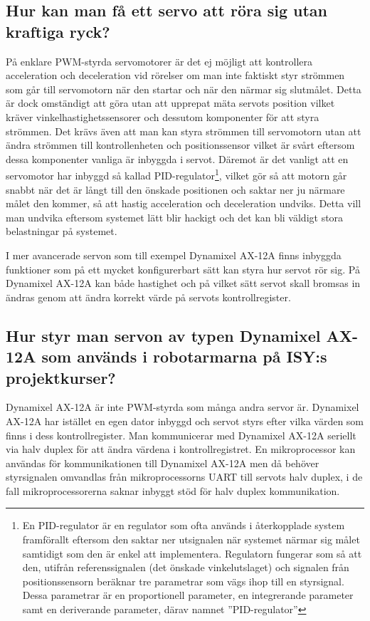 \documentclass[a4paper,12pt]{article}
\begin{document}
\subsection{Hur kan man få ett servo att röra sig utan kraftiga ryck?}
På enklare PWM-styrda servomotorer är det ej möjligt att kontrollera acceleration och deceleration vid rörelser om man inte faktiskt styr strömmen som går till servomotorn när den startar och när den närmar sig slutmålet. Detta är dock omständigt att göra utan att upprepat mäta servots position vilket kräver vinkelhastighetssensorer och dessutom komponenter för att styra strömmen. Det krävs även att man kan styra strömmen till servomotorn utan att ändra strömmen till kontrollenheten och positionssensor vilket är svårt eftersom dessa komponenter vanliga är inbyggda i servot. Däremot är det vanligt att en servomotor har inbyggd så kallad PID-regulator\footnote{En PID-regulator är en regulator som ofta används i återkopplade system framförallt eftersom den saktar ner utsignalen när systemet närmar sig målet samtidigt som den är enkel att implementera. Regulatorn fungerar som så att den, utifrån referenssignalen (det önskade vinkelutslaget) och signalen från positionssensorn beräknar tre parametrar som vägs ihop till en styrsignal. Dessa parametrar är en proportionell parameter, en integrerande parameter samt en deriverande parameter, därav namnet ”PID-regulator”}, vilket gör så att motorn går snabbt när det är långt till den önskade positionen och saktar ner ju närmare målet den kommer, så att hastig acceleration och deceleration undviks. Detta vill man undvika eftersom systemet lätt blir hackigt och det kan bli väldigt stora belastningar på systemet. 

I mer avancerade servon som till exempel Dynamixel AX-12A finns inbyggda funktioner som på ett mycket konfigurerbart sätt kan styra hur servot rör sig. På Dynamixel AX-12A kan både hastighet och på vilket sätt servot skall bromsas in ändras genom att ändra korrekt värde på servots kontrollregister. 

\subsection{Hur styr man servon av typen Dynamixel AX-12A som används i robotarmarna på ISY:s projektkurser?}
Dynamixel AX-12A är inte PWM-styrda som många andra servor är. Dynamixel AX-12A har istället en egen dator inbyggd och servot styrs efter vilka värden som finns i dess kontrollregister. Man kommunicerar med Dynamixel AX-12A seriellt via halv duplex för att ändra värdena i kontrollregistret. En mikroprocessor kan användas för kommunikationen till Dynamixel AX-12A men då behöver styrsignalen omvandlas från mikroprocessorns UART till servots halv duplex, i de fall mikroprocessorerna saknar inbyggt stöd för halv duplex kommunikation.
\newpage
\end{document}
